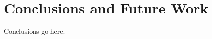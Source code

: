 \documentclass[../main.tex]{subfiles}
\begin{document}
\section{Conclusions and Future Work}


Conclusions go here.
\end{document}
